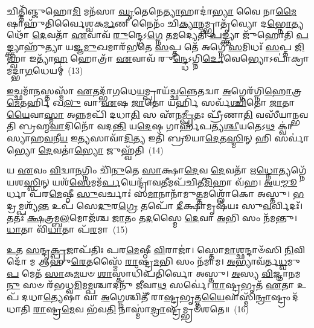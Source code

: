𑌚𑌿𑌤𑍍𑌤𑌿᳴𑌞𑍍𑌜𑍁𑌹𑍋\-\ul{𑌮𑌿} 𑌮𑌨᳴𑌸𑌾 \ul{𑌘𑍃}\-𑌤𑍇𑌨𑍇\-\ul{𑌤𑍍𑌯𑌾}\-𑌹𑌾𑌦𑌾॑\-\ul{𑌭𑍍𑌯𑌾} 𑌵𑍈 𑌨𑌾\-\ul{𑌮𑍈}\-𑌷𑌾𑌹𑍁᳴𑌤𑌿𑌰𑍍𑌵𑍈𑌶𑍍𑌵𑌕\-\ul{𑌰𑍍𑌮}\-𑌣𑍀 𑌨𑍈𑌨𑌂᳴ 𑌚𑌿\-\ul{𑌕𑍍𑌯𑌾}\-𑌨𑌮𑍍𑌭𑍍𑌰𑌾𑌤𑍃᳴𑌵𑍍𑌯𑍋 𑌦\-\ul{𑌭𑍍𑌨𑍋}\-𑌤𑍍𑌯𑌥𑍋᳴ \ul{𑌦𑍇}\-𑌵𑌤𑌾᳴ \ul{𑌏}\-𑌵𑌾𑌵᳴ \ul{𑌰𑍁}\-𑌨𑍍𑌦𑍍𑌧𑍇\-𑌽\-\ul{𑌗𑍍𑌨𑍇} 𑌤\-\ul{𑌮}\-𑌦𑍍𑌯𑍇𑌤𑌿᳴ \ul{𑌪}\-𑌙𑍍𑌕𑍍𑌤𑍍𑌯𑌾 𑌜𑍁᳴𑌹𑍋𑌤𑌿 \ul{𑌪}\-𑌙𑍍𑌕𑍍𑌤𑍍𑌯𑌾𑌹𑍁᳴𑌤𑍍𑌯𑌾 𑌯𑌜𑍍𑌞\-\ul{𑌮𑍁}\-𑌖𑌮𑌾𑌰᳴𑌭𑌤𑍇 \ul{𑌸}\-𑌪𑍍𑌤 𑌤𑍇᳴ 𑌅𑌗𑍍𑌨𑍇 \ul{𑌸}\-𑌮𑌿𑌧𑌃᳴ \ul{𑌸}\-𑌪𑍍𑌤 \ul{𑌜𑌿}\-𑌹𑍍𑌵𑌾 𑌇𑌤𑍍𑌯𑌾᳴\-\ul{𑌹} 𑌹𑍋𑌤𑍍𑌰𑌾᳴ \ul{𑌏}\-𑌵𑌾𑌵᳴ 𑌰𑍁\-\ul{𑌨𑍍𑌦𑍍𑌧𑍇}\-\-𑌽𑌗𑍍𑌨𑌿\-\ul{𑌰𑍍𑌦𑍇}\-𑌵𑍇𑌭𑍍𑌯𑍋\-𑌽𑌪𑌾॑𑌕𑍍𑌰𑌾𑌮𑌦𑍍𑌭𑌾\-\ul{𑌗}\-𑌧𑍇𑌯𑌮𑍍॑~(13)

\-\ul{𑌇}\-𑌚𑍍𑌛𑌮𑌾᳴\-\ul{𑌨}\-𑌸𑍍𑌤𑌸𑍍𑌮𑌾᳴ \ul{𑌏}\-𑌤𑌦𑍍𑌭𑌾᳴\-\ul{𑌗}\-𑌧𑍇\-\ul{𑌯}\-𑌮𑍍𑌪𑍍𑌰𑌾𑌯᳴𑌚𑍍𑌛\-\ul{𑌨𑍍𑌨𑍇}\-𑌤𑌦𑍍𑌵𑌾 \ul{𑌅}\-𑌗𑍍𑌨𑍇𑌰᳴𑌗𑍍𑌨𑌿\-\ul{𑌹𑍋}\-𑌤𑍍𑌰\-\ul{𑌮𑍇}\-𑌤𑌰𑍍\mbox{}\-\ul{𑌹𑌿} 𑌖\-\ul{𑌲𑍁} 𑌵𑌾 \ul{𑌏}\-𑌷 \ul{𑌜𑌾}\-𑌤𑍋 𑌯𑌰𑍍\mbox{}\-\ul{𑌹𑌿} 𑌸𑌰𑍍𑌵᳴\-\ul{𑌶𑍍𑌚𑌿}\-𑌤𑍋 \ul{𑌜𑌾}\-𑌤𑌾\-\ul{𑌯𑍈}\-𑌵𑌾\-\ul{𑌸𑍍𑌮𑌾} 𑌅\-\ul{𑌨𑍍𑌨}\-𑌮𑌪𑌿᳴ 𑌦𑌧𑌾\-\ul{𑌤𑌿} 𑌸 𑌏᳴𑌨\-\ul{𑌮𑍍𑌪𑍍𑌰𑍀}\-𑌤𑌃 𑌪𑍍𑌰𑍀᳴𑌣𑌾\-\ul{𑌤𑌿} 𑌵𑌸𑍀᳴𑌯𑌾𑌨𑍍𑌭𑌵𑌤𑌿 𑌬𑍍𑌰𑌹𑍍𑌮\-\ul{𑌵𑌾}\-𑌦𑌿𑌨𑍋᳴ 𑌵𑌦\-\ul{𑌨𑍍𑌤𑌿} 𑌯\-\ul{𑌦𑍇}\-𑌷 𑌗𑌾𑌰𑍍\mbox{}𑌹᳴𑌪𑌤𑍍𑌯\-\ul{𑌶𑍍𑌚𑍀}\-𑌯𑌤𑍇\-𑌽\-\ul{𑌥} 𑌕𑍍𑌵𑌾॑𑌸𑍍𑌯𑌾𑌹\-\ul{𑌵}\-𑌨𑍀\-\ul{𑌯} 𑌇\-\ul{𑌤𑍍𑌯}\-𑌸𑌾𑌵𑌾᳴\-\ul{𑌦𑌿}\-𑌤𑍍𑌯 𑌇𑌤𑌿᳴ 𑌬𑍍𑌰𑍂𑌯𑌾\-\ul{𑌦𑍇}\-𑌤\-\ul{𑌸𑍍𑌮𑌿}\-𑌨𑍍 𑌹𑌿 𑌸𑌰𑍍𑌵𑌾॑𑌭𑍍𑌯𑍋 \ul{𑌦𑍇}\-𑌵𑌤𑌾॑\-\ul{𑌭𑍍𑌯𑍋} 𑌜𑍁𑌹𑍍𑌵᳴𑌤𑌿~(14)

𑌯 \ul{𑌏}\-𑌵𑌂 \ul{𑌵𑌿}\-𑌦𑍍𑌵𑌾\-\ul{𑌨}\-𑌗𑍍𑌨𑌿𑌂 𑌚𑌿᳴\-\ul{𑌨𑍁}\-𑌤𑍇 \ul{𑌸𑌾}\-𑌕𑍍𑌷𑌾\-\ul{𑌦𑍇}\-𑌵 \ul{𑌦𑍇}\-𑌵𑌤𑌾᳴ 𑌋\-\ul{𑌧𑍍𑌨𑍋}\-𑌤𑍍𑌯𑌗𑍍𑌨𑍇᳴ 𑌯𑌶\-\ul{𑌸𑍍𑌵𑌿}\-𑌨𑍍 𑌯𑌶᳴\-\ul{𑌸𑍇}\-𑌮𑌮᳴\-\ul{𑌰𑍍𑌪}\-𑌯𑍇𑌨𑍍𑌦𑍍𑌰𑌾᳴𑌵\-\ul{𑌤𑍀}\-𑌮𑌪᳴𑌚𑌿𑌤𑍀\-\ul{𑌮𑌿}\-𑌹𑌾 𑌵᳴𑌹। \ul{𑌅}\-𑌯\-\ul{𑌮𑍍𑌮𑍂}\-𑌰𑍍𑌧𑌾 𑌪᳴𑌰\-\ul{𑌮𑍇}\-𑌷𑍍𑌠𑍀 \ul{𑌸𑍁}\-𑌵𑌰𑍍𑌚𑌾𑌃॑ 𑌸\-\ul{𑌮𑌾}\-𑌨𑌾𑌨𑌾᳴𑌮𑍁\-\ul{𑌤𑍍𑌤}\-𑌮𑌶𑍍𑌲𑍋᳴𑌕𑍋 𑌅𑌸𑍍𑌤𑍁। \ul{𑌭}\-𑌦𑍍𑌰𑌮𑍍𑌪𑌶𑍍𑌯᳴\-\ul{𑌨𑍍𑌤} 𑌉𑌪᳴ 𑌸𑍇\-\ul{𑌦𑍁}\-𑌰\-\ul{𑌗𑍍𑌰𑍇} 𑌤𑌪𑍋᳴ \ul{𑌦𑍀}\-𑌕𑍍𑌷𑌾𑌮𑍃𑌷᳴𑌯𑌃 𑌸𑍁\-\ul{𑌵}\-𑌰𑍍𑌵𑌿𑌦𑌃᳴। 𑌤𑌤𑌃᳴ \ul{𑌕𑍍𑌷}\-𑌤𑍍𑌰𑌮𑍍𑌬\-\ul{𑌲}\-𑌮𑍋𑌜᳴𑌶𑍍𑌚 \ul{𑌜𑌾}\-𑌤𑌂 𑌤\-\ul{𑌦}\-𑌸𑍍𑌮𑍈 \ul{𑌦𑍇}\-𑌵𑌾 \ul{𑌅}\-𑌭𑌿 𑌸𑌂 𑌨᳴𑌮𑌨𑍍𑌤𑍁। \ul{𑌧𑌾}\-𑌤𑌾 𑌵𑌿᳴\-\ul{𑌧𑌾}\-𑌤𑌾 𑌪᳴\-\ul{𑌰}\-𑌮𑌾~(15)

\-\ul{𑌉}\-𑌤 \ul{𑌸}\-𑌨𑍍𑌦𑍃\-\ul{𑌕𑍍𑌪𑍍𑌰}\-𑌜𑌾𑌪᳴𑌤𑌿𑌃 𑌪𑌰\-\ul{𑌮𑍇}\-𑌷𑍍𑌠𑍀 \ul{𑌵𑌿}\-𑌰𑌾𑌜𑌾॑। 𑌸𑍍𑌤𑍋\-\ul{𑌮𑌾}\-𑌶𑍍𑌛𑌨𑍍𑌦𑌾𑍞᳴𑌸𑌿 \ul{𑌨𑌿}\-𑌵𑌿𑌦𑍋᳴ 𑌮 𑌆𑌹𑍁\-\ul{𑌰𑍇}\-𑌤𑌸𑍍𑌮𑍈᳴ \ul{𑌰𑌾}\-𑌷𑍍𑌟𑍍𑌰\-\ul{𑌮}\-𑌭𑌿 𑌸𑌂 𑌨᳴𑌮𑌾𑌮। \ul{𑌅}\-𑌭𑍍𑌯𑌾𑌵᳴𑌰𑍍𑌤\-\ul{𑌧𑍍𑌵}\-𑌮𑍁\-\ul{𑌪} 𑌮𑍇𑌤᳴ \ul{𑌸𑌾}\-𑌕\-\ul{𑌮}\-𑌯𑍞 \ul{𑌶𑌾}\-𑌸𑍍𑌤𑌾𑌧𑌿᳴𑌪𑌤𑌿𑌰𑍍𑌵𑍋 𑌅𑌸𑍍𑌤𑍁। \ul{𑌅}\-𑌸𑍍𑌯 \ul{𑌵𑌿}\-𑌜𑍍𑌞𑌾\-\ul{𑌨}\-𑌮\-\ul{𑌨𑍁} 𑌸𑍞 𑌰᳴𑌭𑌧𑍍𑌵\-\ul{𑌮𑌿}\-𑌮\-\ul{𑌮𑍍𑌪}\-𑌶𑍍𑌚𑌾𑌦𑌨𑍁᳴ 𑌜𑍀𑌵𑌾\-\ul{𑌥} 𑌸𑌰𑍍𑌵𑍇॑। \ul{𑌰𑌾}\-𑌷𑍍𑌟𑍍𑌰𑌭𑍃𑌤᳴ \ul{𑌏}\-𑌤𑌾 𑌉𑌪᳴ 𑌦𑌧𑌾\-\ul{𑌤𑍍𑌯𑍇}\-𑌷𑌾 𑌵𑌾 \ul{𑌅}\-𑌗𑍍𑌨𑍇𑌶𑍍𑌚𑌿𑌤𑍀᳴ 𑌰𑌾\-\ul{𑌷𑍍𑌟𑍍𑌰}\-𑌭𑍃𑌤𑍍𑌤\-\ul{𑌯𑍈}\-𑌵𑌾𑌸𑍍𑌮𑌿᳴\-\ul{𑌨𑍍𑌰𑌾}\-𑌷𑍍𑌟𑍍𑌰𑌂 𑌦᳴𑌧𑌾𑌤𑌿 \ul{𑌰𑌾}\-𑌷𑍍𑌟𑍍𑌰\-\ul{𑌮𑍇}\-𑌵 𑌭᳴𑌵\-\ul{𑌤𑌿} 𑌨𑌾𑌸𑍍𑌮𑌾॑\-\ul{𑌦𑍍𑌰𑌾}\-𑌷𑍍𑌟𑍍𑌰𑌮𑍍𑌭𑍍𑌰𑍞᳴𑌶𑌤𑍇॥~(16)

{\anuvakamend[{\-\ul{𑌭𑌾}\-\-\ul{𑌗}\-𑌧𑍇\-\ul{𑌯}\-𑌞𑍍𑌜𑍁𑌹𑍍𑌵᳴𑌤𑌿 𑌪\-\ul{𑌰}\-𑌮𑌾 \ul{𑌰𑌾}\-𑌷𑍍𑌟𑍍𑌰𑌂 𑌦᳴𑌧𑌾𑌤𑌿 \ul{𑌸}\-𑌪𑍍𑌤 𑌚᳴}]}%

